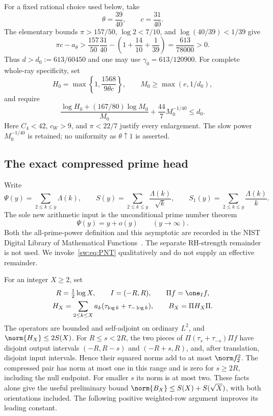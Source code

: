 \documentclass[11pt,a4paper]{article}
\numberwithin{equation}{section}
\theoremstyle{definition}\newtheorem{definition}[theorem]{Definition}
\theoremstyle{remark}\newtheorem{remark}[theorem]{Remark}
\begin{document}
For a fixed rational choice used below, take
\begin{equation}\label{sw:eq:rational-anchor}
 \theta=\frac{39}{40},\qquad c=\frac{31}{40}.
\end{equation}
The elementary bounds $\pi>157/50$, $\log2<7/10$, and $\log(40/39)<1/39$ give
\begin{equation}\label{sw:eq:anchor-slack}
 \pi c-a_\theta>
 \frac{157}{50}\frac{31}{40}
       -\left(1+\frac{14}{10}+\frac1{39}\right)
 =\frac{613}{78000}>0.
\end{equation}
Thus $d>d_0:=613/60450$ and one may use $\gamma_0=613/120900$. For complete whole-ray specificity, set
\[
 H_0=\max\left\{1,\frac{1568}{9\theta c}\right\},\qquad
 M_0\ge\max(e,1/d_0),
\]
and require
\begin{equation}\label{sw:eq:rational-anchor-threshold}
 \frac{\log H_0+(167/80)\log M_0}{M_0}
          +\frac{44}{7}M_0^{-1/40}\le d_0.
\end{equation}
Here $C_4<42$, $c_W>9$, and $\pi<22/7$ justify every enlargement. The slow power $M_0^{-1/40}$ is retained; no uniformity as $\theta\uparrow1$ is asserted.

\subsection{The exact compressed prime head}\label{sw:sec:schur}
Write
\[
 \Psi(y)=\sum_{2\le k\le y}\Lambda(k),\qquad
 S(y)=\sum_{2\le k\le y}\frac{\Lambda(k)}{\sqrt k},\qquad
 S_1(y)=\sum_{2\le k\le y}\frac{\Lambda(k)}k.
\]
The sole new arithmetic input is the unconditional prime number theorem
\begin{equation}\label{sw:eq:PNT}
 \Psi(y)=y+o(y)\qquad(y\longrightarrow\infty).
\end{equation}
Both the all-prime-power definition and this asymptotic are recorded in the NIST Digital Library of Mathematical Functions~\cite[25.16.1 and 25.16.3]{DLMF}. The separate RH-strength remainder is not used. We invoke~\eqref{sw:eq:PNT} qualitatively and do not supply an effective remainder.

For an integer $X\ge2$, set
\begin{equation}\label{sw:eq:head-operators}
 \begin{gathered}
 R=\tfrac12\log X,\qquad I=(-R,R),\qquad \Pi f=\one_I f,\\
 H_X=\sum_{2\le k\le X}a_k(\tau_{\log k}+\tau_{-\log k}),
 \qquad B_X=\Pi H_X\Pi.
 \end{gathered}
\end{equation}
The operators are bounded and self-adjoint on ordinary $L^2$, and
$\norm{H_X}\le2S(X)$. For $R\le s<2R$, the two pieces of
$\Pi(\tau_s+\tau_{-s})\Pi f$ have disjoint output intervals $(-R,R-s)$ and $(-R+s,R)$, and, after translation, disjoint input intervals. Hence their squared norms add to at most $\norm f_2^2$. The compressed pair has norm at most one in this range and is zero for $s\ge2R$, including the null endpoint. For smaller $s$ its norm is at most two. These facts alone give the useful preliminary bound
$\norm{B_X}\le S(X)+S(\sqrt X)$, with both orientations included. The following positive weighted-row argument improves its leading constant.
\end{document}

